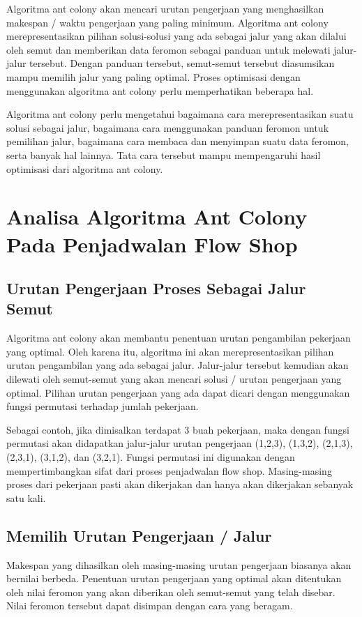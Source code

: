 	Algoritma ant colony akan mencari urutan pengerjaan yang menghasilkan makespan / waktu
	pengerjaan yang paling minimum. Algoritma ant colony merepresentasikan pilihan solusi-solusi
	yang ada sebagai jalur yang akan dilalui oleh semut dan memberikan data feromon sebagai panduan
	untuk melewati jalur-jalur tersebut. Dengan panduan tersebut, semut-semut tersebut diasumsikan
	mampu memilih jalur yang paling optimal.
	Proses optimisasi dengan menggunakan algoritma ant colony perlu memperhatikan beberapa
	hal. 
	
	Algoritma ant colony perlu mengetahui bagaimana cara merepresentasikan suatu solusi sebagai 
	jalur, bagaimana cara menggunakan panduan feromon untuk pemilihan jalur, bagaimana cara
	membaca dan menyimpan suatu data feromon, serta banyak hal lainnya. Tata cara tersebut mampu
	mempengaruhi hasil optimisasi dari algoritma ant colony.
	
\section{Analisa Algoritma Ant Colony Pada Penjadwalan Flow Shop}

\subsection{Urutan Pengerjaan Proses Sebagai Jalur Semut}
	Algoritma ant colony akan membantu penentuan urutan pengambilan pekerjaan yang optimal. Oleh
	karena itu, algoritma ini akan merepresentasikan pilihan urutan pengambilan yang ada sebagai jalur. 
	Jalur-jalur tersebut kemudian akan dilewati oleh semut-semut yang akan mencari solusi / urutan pengerjaan 
	yang optimal. Pilihan urutan pengerjaan yang ada dapat dicari dengan menggunakan fungsi permutasi terhadap 
	jumlah pekerjaan.

	Sebagai contoh, jika dimisalkan terdapat 3 buah pekerjaan, maka dengan fungsi permutasi akan
	didapatkan jalur-jalur urutan pengerjaan (1,2,3), (1,3,2), (2,1,3), (2,3,1), (3,1,2), dan (3,2,1). Fungsi
	permutasi ini digunakan dengan mempertimbangkan sifat dari proses penjadwalan flow shop.
	Masing-masing proses dari pekerjaan pasti akan dikerjakan dan hanya akan dikerjakan sebanyak
	satu kali.

\subsection{Memilih Urutan Pengerjaan / Jalur}
	Makespan yang dihasilkan oleh masing-masing urutan pengerjaan biasanya akan bernilai berbeda.
	Penentuan urutan pengerjaan yang optimal akan ditentukan oleh nilai feromon yang akan diberikan
	oleh semut-semut yang telah disebar. Nilai feromon tersebut dapat disimpan dengan cara yang
	beragam.

